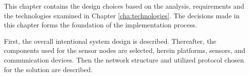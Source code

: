 \label{cha:designintro}

This chapter contains the design choices based on the analysis, requirements and the technologies examined in Chapter \ref{cha:technologies}. The decisions made in this chapter forms the foundation of the implementation process.

First, the overall intentional system design is described. Thereafter, the components used for the sensor nodes are selected, herein platforms, sensors, and communication devices.
Then the network structure and utilized protocol chosen for the solution are described.

